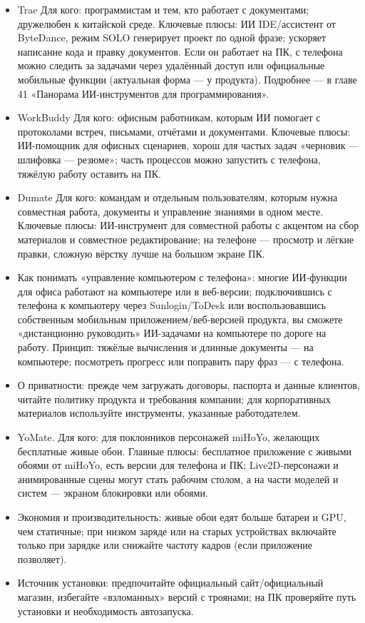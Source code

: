 \begin{itemize}
  \item Trae Для кого: программистам и тем, кто работает с документами; дружелюбен к китайской среде. Ключевые плюсы: ИИ IDE/ассистент от ByteDance, режим SOLO генерирует проект по одной фразе; ускоряет написание кода и правку документов. Если он работает на ПК, с телефона можно следить за задачами через удалённый доступ или официальные мобильные функции (актуальная форма — у продукта). Подробнее — в главе 41 «Панорама ИИ-инструментов для программирования».
  \item WorkBuddy Для кого: офисным работникам, которым ИИ помогает с протоколами встреч, письмами, отчётами и документами. Ключевые плюсы: ИИ-помощник для офисных сценариев, хорош для частых задач «черновик — шлифовка — резюме»; часть процессов можно запустить с телефона, тяжёлую работу оставить на ПК.
  \item Dumate Для кого: командам и отдельным пользователям, которым нужна совместная работа, документы и управление знаниями в одном месте. Ключевые плюсы: ИИ-инструмент для совместной работы с акцентом на сбор материалов и совместное редактирование; на телефоне — просмотр и лёгкие правки, сложную вёрстку лучше на большом экране ПК.
  \item Как понимать «управление компьютером с телефона»: многие ИИ-функции для офиса работают на компьютере или в веб-версии; подключившись с телефона к компьютеру через Sunlogin/ToDesk или воспользовавшись собственным мобильным приложением/веб-версией продукта, вы сможете «дистанционно руководить» ИИ-задачами на компьютере по дороге на работу. Принцип: тяжёлые вычисления и длинные документы — на компьютере; посмотреть прогресс или поправить пару фраз — с телефона.
  \item О приватности: прежде чем загружать договоры, паспорта и данные клиентов, читайте политику продукта и требования компании; для корпоративных материалов используйте инструменты, указанные работодателем.
\end{itemize}


\begin{itemize}
  \item YoMate. Для кого: для поклонников персонажей miHoYo, желающих бесплатные живые обои. Главные плюсы: бесплатное приложение с живыми обоями от miHoYo, есть версии для телефона и ПК; Live2D-персонажи и анимированные сцены могут стать рабочим столом, а на части моделей и систем — экраном блокировки или обоями.
  \item Экономия и производительность: живые обои едят больше батареи и GPU, чем статичные; при низком заряде или на старых устройствах включайте только при зарядке или снижайте частоту кадров (если приложение позволяет).
  \item Источник установки: предпочитайте официальный сайт/официальный магазин, избегайте «взломанных» версий с троянами; на ПК проверяйте путь установки и необходимость автозапуска.
\end{itemize}

